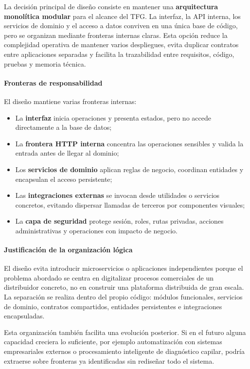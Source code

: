 La decisión principal de diseño consiste en mantener una \textbf{arquitectura monolítica modular} para el alcance del TFG. La interfaz, la API interna, los servicios de dominio y el acceso a datos conviven en una única base de código, pero se organizan mediante fronteras internas claras. Esta opción reduce la complejidad operativa de mantener varios despliegues, evita duplicar contratos entre aplicaciones separadas y facilita la trazabilidad entre requisitos, código, pruebas y memoria técnica.

\paragraph{Fronteras de responsabilidad}

El diseño mantiene varias fronteras internas:

\begin{itemize}
    \item La \textbf{interfaz} inicia operaciones y presenta estados, pero no accede directamente a la base de datos;
    \item La \textbf{frontera HTTP interna} concentra las operaciones sensibles y valida la entrada antes de llegar al dominio;
    \item Los \textbf{servicios de dominio} aplican reglas de negocio, coordinan entidades y encapsulan el acceso persistente;
    \item Las \textbf{integraciones externas} se invocan desde utilidades o servicios concretos, evitando dispersar llamadas de terceros por componentes visuales;
    \item La \textbf{capa de seguridad} protege sesión, roles, rutas privadas, acciones administrativas y operaciones con impacto de negocio.
\end{itemize}

\paragraph{Justificación de la organización lógica}

El diseño evita introducir microservicios o aplicaciones independientes porque el problema abordado se centra en digitalizar procesos comerciales de un distribuidor concreto, no en construir una plataforma distribuida de gran escala. La separación se realiza dentro del propio código: módulos funcionales, servicios de dominio, contratos compartidos, entidades persistentes e integraciones encapsuladas.

Esta organización también facilita una evolución posterior. Si en el futuro alguna capacidad creciera lo suficiente, por ejemplo automatización con sistemas empresariales externos o procesamiento inteligente de diagnóstico capilar, podría extraerse sobre fronteras ya identificadas sin rediseñar todo el sistema.

